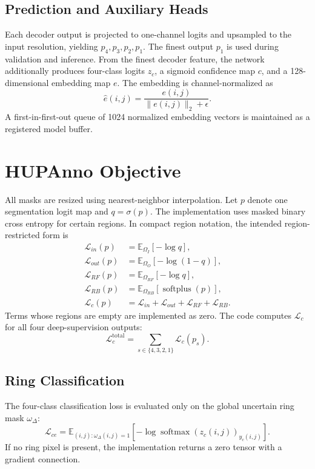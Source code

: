\documentclass[journal]{IEEEtran}
\newcommand{\E}{\mathbb{E}}
\begin{document}
\subsection{Prediction and Auxiliary Heads}
Each decoder output is projected to one-channel logits and upsampled to the input resolution, yielding $p_4,p_3,p_2,p_1$. The finest output $p_1$ is used during validation and inference. From the finest decoder feature, the network additionally produces four-class logits $z_c$, a sigmoid confidence map $c$, and a 128-dimensional embedding map $e$. The embedding is channel-normalized as
\begin{equation}
 \hat e(i,j)=\frac{e(i,j)}{\|e(i,j)\|_2+\epsilon}.
\end{equation}
A first-in-first-out queue of 1024 normalized embedding vectors is maintained as a registered model buffer.

\section{HUPAnno Objective}
All masks are resized using nearest-neighbor interpolation. Let $p$ denote one segmentation logit map and $q=\sigma(p)$. The implementation uses masked binary cross entropy for certain regions. In compact region notation, the intended region-restricted form is
\begin{align}
 \mathcal{L}_{in}(p)&=\E_{\Omega_I}[-\log q],\\
 \mathcal{L}_{out}(p)&=\E_{\Omega_O}[-\log(1-q)],\\
 \mathcal{L}_{RF}(p)&=\E_{\Omega_{RF}}[-\log q],\\
 \mathcal{L}_{RB}(p)&=\E_{\Omega_{RB}}[\operatorname{softplus}(p)],\\
 \mathcal{L}_c(p)&=\mathcal{L}_{in}+\mathcal{L}_{out}+\mathcal{L}_{RF}+\mathcal{L}_{RB}.
\end{align}
Terms whose regions are empty are implemented as zero. The code computes $\mathcal{L}_c$ for all four deep-supervision outputs:
\begin{equation}
 \mathcal{L}_c^{\mathrm{total}}=\sum_{s\in\{4,3,2,1\}}\mathcal{L}_c(p_s).
\end{equation}

\subsection{Ring Classification}
The four-class classification loss is evaluated only on the global uncertain ring mask $\omega_\Delta$:
\begin{equation}
 \mathcal{L}_{ce}=\E_{(i,j):\omega_\Delta(i,j)=1}
 \left[-\log\operatorname{softmax}(z_c(i,j))_{y_c(i,j)}\right].
\end{equation}
If no ring pixel is present, the implementation returns a zero tensor with a gradient connection.
\end{document}
